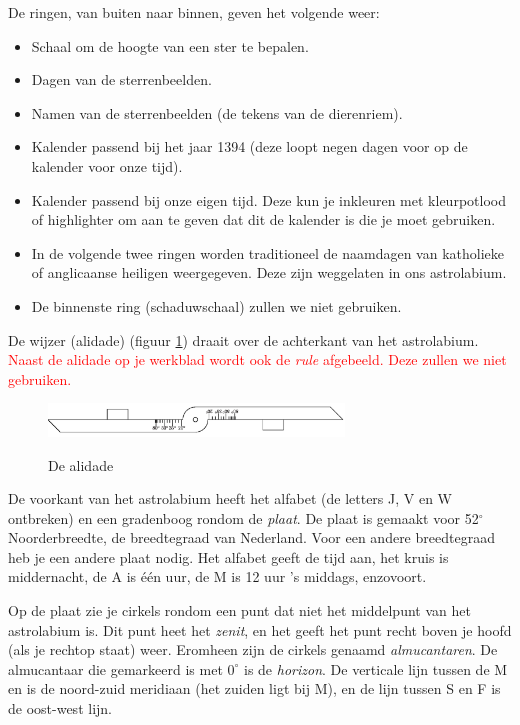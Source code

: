 De ringen, van buiten naar binnen, geven het volgende weer:
\begin{itemize}
 \item Schaal om de hoogte van een ster te bepalen.
 \item Dagen van de sterrenbeelden.
 \item Namen van de sterrenbeelden (de tekens van de dierenriem).
 \item Kalender passend bij het jaar 1394 (deze loopt negen dagen voor op de kalender voor onze tijd).
 \item Kalender passend bij onze eigen tijd. Deze kun je inkleuren met kleurpotlood of highlighter om aan te geven dat dit de kalender is die je moet gebruiken.
 \item In de volgende twee ringen worden traditioneel de naamdagen van katholieke of anglicaanse heiligen weergegeven. Deze zijn weggelaten in ons astrolabium.
 \item De binnenste ring (schaduwschaal) zullen we niet gebruiken.
\end{itemize}

De wijzer (alidade) (figuur \ref{alidade}) draait over de achterkant van het astrolabium. \textcolor{red}{Naast de alidade op je werkblad wordt ook de \textit{rule} afgebeeld. Deze zullen we niet gebruiken.}

\begin{figure}
 \includegraphics[width=0.7\textwidth]{astrolabiumNL/alidade}
 \label{alidade}
 \caption{De alidade}
\end{figure}

De voorkant van het astrolabium heeft het alfabet (de letters J, V en W ontbreken) en een gradenboog rondom de \textit{plaat}. De plaat is gemaakt voor 52$^\circ$ Noorderbreedte, de breedtegraad van Nederland. Voor een andere breedtegraad heb je een andere plaat nodig. Het alfabet geeft de tijd aan, het kruis \kreuz is middernacht, de A is \'e\'en uur, de M is 12 uur 's middags, enzovoort.

Op de plaat zie je cirkels rondom een punt dat niet het middelpunt van het astrolabium is. Dit punt heet het \textit{zenit}, en het geeft het punt recht boven je hoofd (als je rechtop staat) weer. Eromheen zijn de cirkels genaamd \textit{almucantaren}. De almucantaar die gemarkeerd is met $0^\circ$ is de \textit{horizon}. De verticale lijn tussen de M en \kreuz is de noord-zuid meridiaan (het zuiden ligt bij M), en de lijn tussen S en F is de oost-west lijn.

